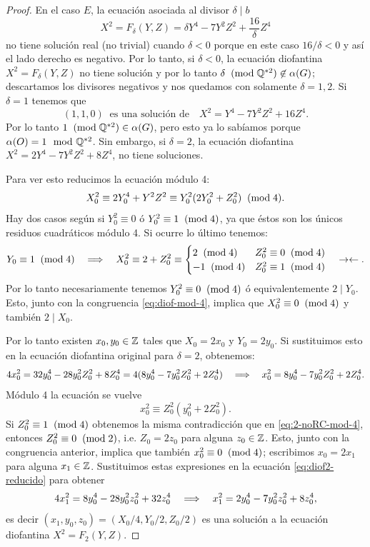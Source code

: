 \documentclass[../../tesis_maestria]{subfiles}
\begin{document}
\begin{proof}
En el caso $E$, la ecuación asociada al divisor $\delta\mid b$
\[
	X^2=F_\delta(Y,Z)=\delta Y^4-7 Y^2 Z^2+\frac{16}{\delta}Z^4
\]
no tiene solución real (no trivial) cuando $\delta<0$ porque en este caso $16/\delta<0$ y así el lado derecho es negativo. Por lo tanto, si $\delta<0$, la ecuación diofantina $X^2=F_\delta(Y,Z)$ no tiene solución y por lo tanto $\delta\;\;(\mathrm{mod}\; \mathbb{Q}^{*2})\not\in\alpha(G)$; descartamos los divisores negativos y nos quedamos con solamente $\delta=1,2$. Si $\delta=1$ tenemos que
\[
	(1,1,0)\;\;\text{es una solución de}\quad X^2=Y^4-7 Y^2 Z^2+16Z^4.
\]
Por lo tanto $1\;\;(\mathrm{mod}\; \mathbb{Q}^{*2})\in\alpha(G)$, pero esto ya lo sabíamos porque $\alpha(O)=1\mod{\mathbb{Q}^{*2}}$. Sin embargo, si $\delta=2$, la ecuación diofantina $X^2=2Y^4-7 Y^2 Z^2+8 Z^4$, no tiene soluciones.

Para ver esto reducimos la ecuación módulo 4:
\begin{equation}\label{eq:diof-mod-4}
	X_0^2\equiv 2 Y_0^4+Y^2 Z^2\equiv Y_0^2(2Y_0^2+Z_0^2) \;\;(\mathrm{mod}\; 4).
\end{equation}
Hay dos casos según si $Y_0^2\equiv0$ ó $Y_0^2\equiv1\;\;(\mathrm{mod}\; 4)$, ya que éstos son los únicos residuos cuadráticos módulo 4. Si ocurre lo último tenemos:
\begin{equation}\label{eq:2-noRC-mod-4}
	Y_0\equiv1\;\;(\mathrm{mod}\; 4)\quad\Longrightarrow\quad
	X_0^2\equiv 2+Z_0^2\equiv\begin{cases}2\;\;(\mathrm{mod}\; 4) & Z_0^2\equiv0\;\;(\mathrm{mod}\; 4)\\ -1\;\;(\mathrm{mod}\; 4) & Z_0^2\equiv1\;\;(\mathrm{mod}\; 4) \end{cases}
	\quad\rightarrow\leftarrow.
\end{equation}
Por lo tanto necesariamente tenemos $Y_0^2\equiv0\;\;(\mathrm{mod}\; 4)$ ó equivalentemente $2\mid Y_0$. Esto, junto con la congruencia \eqref{eq:diof-mod-4}, implica que $X_0^2\equiv0\;\;(\mathrm{mod}\; 4)$ y también $2\mid X_0$.

Por lo tanto existen $x_0,y_0\in\mathbb{Z}$ tales que $X_0=2x_0$ y $Y_0=2y_0$. Si sustituimos esto en la ecuación diofantina original para $\delta=2$, obtenemos:
\begin{equation}\label{eq:diof2-reducido}
	4x_0^2= 32 y_0^4-28y_0^2 Z_0^2+8Z_0^4=4(8 y_0^4-7y_0^2 Z_0^2+2Z_0^4)\quad\Longrightarrow\quad
	x_0^2=8 y_0^4-7y_0^2 Z_0^2+2Z_0^4.
\end{equation}
Módulo 4 la ecuación se vuelve
\[
	x_0^2\equiv Z_0^2(y_0^2+2Z_0^2).
\]
Si $Z_0^2\equiv1\;\;(\mathrm{mod}\; 4)$ obtenemos la misma contradicción que en \eqref{eq:2-noRC-mod-4}, entonces $Z_0^2\equiv0\;\;(\mathrm{mod}\; 2)$, i.e. $Z_0=2z_0$ para alguna $z_0\in\mathbb{Z}$. Esto, junto con la congruencia anterior, implica que también $x_0^2\equiv0\;\;(\mathrm{mod}\; 4)$; escribimos $x_0=2x_1$ para alguna $x_1\in\mathbb{Z}$. Sustituimos estas expresiones en la ecuación \eqref{eq:diof2-reducido} para obtener
\[
	4x_1^2=8 y_0^4-28y_0^2 z_0^2+32z_0^4\quad\Longrightarrow\quad
	x_1^2=2y_0^4-7y_0^2z_0^2+8z_0^4,
\]
es decir $(x_1,y_0,z_0)=(X_0/4,Y_0/2,Z_0/2)$ es una solución a la ecuación diofantina $X^2=F_2(Y,Z)$.


\end{proof}
\end{document}

